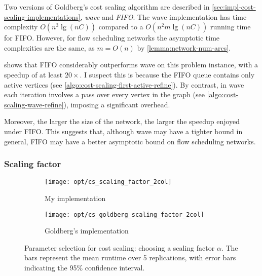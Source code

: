 Two versions of Goldberg's cost scaling algorithm are described in \cref{sec:impl-cost-scaling-implementations}, \emph{wave} and \emph{FIFO}. The wave implementation has time complexity $O\left(n^3 \lg \left(nC\right)\right)$ compared to a $O\left(n^2m\lg\left(nC\right)\right)$ running time for FIFO. However, for flow scheduling networks the asymptotic time complexities are the same, as $m = O(n)$ by \cref{lemma:network-num-arcs}. 

 shows that FIFO considerably outperforms wave on this problem instance, with a speedup of at least $20\times$. I suspect this is because the FIFO queue contains only active vertices (see \cref{algo:cost-scaling-first-active-refine}). By contrast, in wave each iteration involves a pass over every vertex in the graph (see \cref{algo:cost-scaling-wave-refine}), imposing a significant overhead.

Moreover, the larger the size of the network, the larger the speedup enjoyed under FIFO. This suggests that, although wave may have a tighter bound in general, FIFO may have a better asymptotic bound on flow scheduling networks.


\subsubsection{Scaling factor}

\begin{figure}
    \begin{widepage}
    \begin{subfigure}[c]{0.5\textwidth}
        \texttt{[image: opt/cs\_scaling\_factor\_2col]}
        \caption{My implementation}
    \end{subfigure}
    \begin{subfigure}[c]{0.5\textwidth}
        \texttt{[image: opt/cs\_goldberg\_scaling\_factor\_2col]}
        \caption{Goldberg's implementation}
    \end{subfigure}
    \end{widepage}
    \caption[Parameter selection for cost scaling]{Parameter selection for cost scaling: choosing a scaling factor $\alpha$. The bars represent the mean runtime over 5 replications, with error bars indicating the 95\% confidence interval.}
    \label{fig:opt-cs-scaling-factor}
\end{figure}

